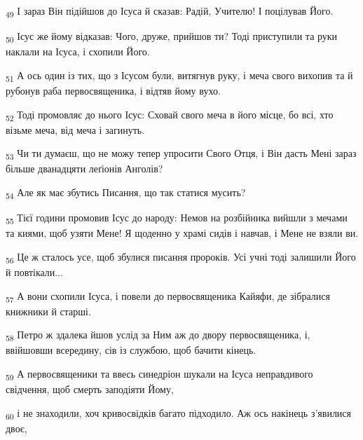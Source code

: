 \begin{tcolorbox}
\textsubscript{49} І зараз Він підійшов до Ісуса й сказав: Радій, Учителю! І поцілував Його.
\end{tcolorbox}
\begin{tcolorbox}
\textsubscript{50} Ісус же йому відказав: Чого, друже, прийшов ти? Тоді приступили та руки наклали на Ісуса, і схопили Його.
\end{tcolorbox}
\begin{tcolorbox}
\textsubscript{51} А ось один із тих, що з Ісусом були, витягнув руку, і меча свого вихопив та й рубонув раба первосвященика, і відтяв йому вухо.
\end{tcolorbox}
\begin{tcolorbox}
\textsubscript{52} Тоді промовляє до нього Ісус: Сховай свого меча в його місце, бо всі, хто візьме меча, від меча і загинуть.
\end{tcolorbox}
\begin{tcolorbox}
\textsubscript{53} Чи ти думаєш, що не можу тепер упросити Свого Отця, і Він дасть Мені зараз більше дванадцяти леґіонів Анголів?
\end{tcolorbox}
\begin{tcolorbox}
\textsubscript{54} Але як має збутись Писання, що так статися мусить?
\end{tcolorbox}
\begin{tcolorbox}
\textsubscript{55} Тієї години промовив Ісус до народу: Немов на розбійника вийшли з мечами та киями, щоб узяти Мене! Я щоденно у храмі сидів і навчав, і Мене не взяли ви.
\end{tcolorbox}
\begin{tcolorbox}
\textsubscript{56} Це ж сталось усе, щоб збулися писання пророків. Усі учні тоді залишили Його й повтікали...
\end{tcolorbox}
\begin{tcolorbox}
\textsubscript{57} А вони схопили Ісуса, і повели до первосвященика Кайяфи, де зібралися книжники й старші.
\end{tcolorbox}
\begin{tcolorbox}
\textsubscript{58} Петро ж здалека йшов услід за Ним аж до двору первосвященика, і, ввійшовши всередину, сів із службою, щоб бачити кінець.
\end{tcolorbox}
\begin{tcolorbox}
\textsubscript{59} А первосвященики та ввесь синедріон шукали на Ісуса неправдивого свідчення, щоб смерть заподіяти Йому,
\end{tcolorbox}
\begin{tcolorbox}
\textsubscript{60} і не знаходили, хоч кривосвідків багато підходило. Аж ось накінець з'явилися двоє,
\end{tcolorbox}
